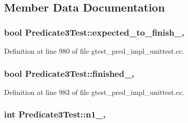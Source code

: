 \subsection{Member Data Documentation}
\subsubsection[{\texorpdfstring{expected\+\_\+to\+\_\+finish\+\_\+}{expected_to_finish_}}]{\setlength{\rightskip}{0pt plus 5cm}bool Predicate3\+Test\+::expected\+\_\+to\+\_\+finish\+\_\+\hspace{0.3cm}{\ttfamily [static]}, {\ttfamily [protected]}}\hypertarget{class_predicate3_test_a42c11555410ee89bf6e59d39336a212c}{}\label{class_predicate3_test_a42c11555410ee89bf6e59d39336a212c}


Definition at line 980 of file gtest\+\_\+pred\+\_\+impl\+\_\+unittest.\+cc.

\subsubsection[{\texorpdfstring{finished\+\_\+}{finished_}}]{\setlength{\rightskip}{0pt plus 5cm}bool Predicate3\+Test\+::finished\+\_\+\hspace{0.3cm}{\ttfamily [static]}, {\ttfamily [protected]}}\hypertarget{class_predicate3_test_aa2ef0fa6aed09d872fb9ae36961b49eb}{}\label{class_predicate3_test_aa2ef0fa6aed09d872fb9ae36961b49eb}


Definition at line 983 of file gtest\+\_\+pred\+\_\+impl\+\_\+unittest.\+cc.

\subsubsection[{\texorpdfstring{n1\+\_\+}{n1_}}]{\setlength{\rightskip}{0pt plus 5cm}int Predicate3\+Test\+::n1\+\_\+\hspace{0.3cm}{\ttfamily [static]}, {\ttfamily [protected]}}\hypertarget{class_predicate3_test_ac232320a93f0c1e09886148a3e1929a5}{}\label{class_predicate3_test_ac232320a93f0c1e09886148a3e1929a5}


